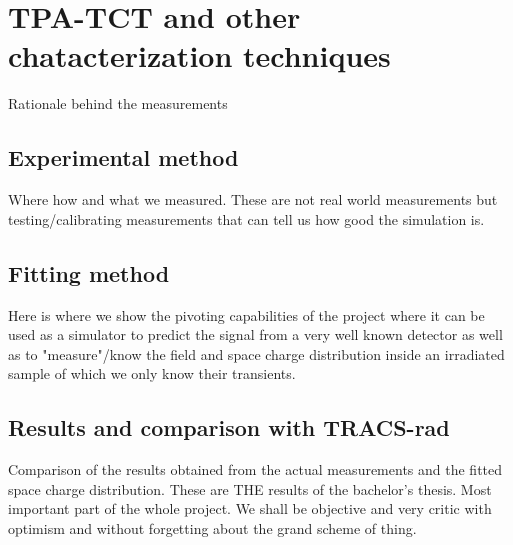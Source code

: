 \chapter{TPA-TCT and other chatacterization techniques}

Rationale behind the measurements

\section{Experimental method} %
\label{sec:experimental_method}

Where how and what we measured. These are not real world measurements but testing/calibrating measurements that can tell us how good the simulation is. 


\section{Fitting method} %
\label{sec:fitting_method}

Here is where we show the pivoting capabilities of the project where it can be used as a simulator to predict the signal from a very well known detector as well as to "measure"/know the field and space charge distribution inside an irradiated sample of which we only know their transients.


\section{Results and comparison with TRACS-rad} %
\label{sec:results_and_comparison_with_tracs_rad}

Comparison of the results obtained from the actual measurements and the fitted space charge distribution. These are THE results of the bachelor's thesis. Most important part of the whole  project. We shall be objective and very critic with optimism and without forgetting about the grand scheme of thing.

